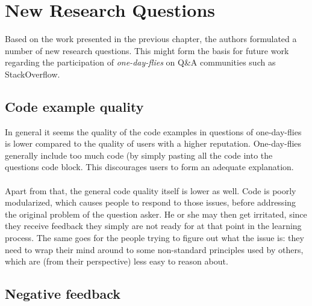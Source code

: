 \documentclass[conference]{IEEEtran}
\begin{document}
\section{New Research Questions}
\label{NewResearchQuestions}

Based on the work presented in the previous chapter, the authors formulated a number of new research questions. This might form the basis for future work regarding the participation of \textit{one-day-flies} on Q\&A communities such as StackOverflow.

\subsection{Code example quality}

In general it seems the quality of the code examples in questions of one-day-flies is lower compared to the quality of users with a higher reputation. One-day-flies generally include too much code (by simply pasting all the code into the questions code block. This discourages users to form an adequate explanation.
\\
\\
Apart from that, the general code quality itself is lower as well. Code is poorly modularized, which causes people to respond to those issues, before addressing the original problem of the question asker. He or she may then get irritated, since they receive feedback they simply are not ready for at that point in the learning process. The same goes for the people trying to figure out what the issue is: they need to wrap their mind around to some non-standard principles used by others, which are (from their perspective) less easy to reason about.

\subsection{Negative feedback}
\end{document}
